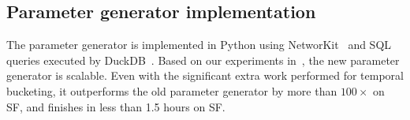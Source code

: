 \subsection{Parameter generator implementation}
\label{sec:paramgen-implementation}

%
The parameter generator is implemented in Python using NetworKit~\cite{lit:networkit} and SQL queries executed by DuckDB~\cite{DBLP:conf/sigmod/RaasveldtM19}.
%
%
Based on our experiments in~\cite[Figure~4.3]{david-puroja-msc}, the new parameter generator is scalable.
Even with the significant extra work performed for temporal bucketing,
it outperforms the old parameter generator by more than $100\times$ on SF,
and finishes in less than 1.5 hours on SF.
